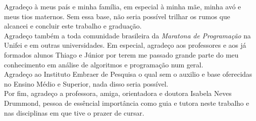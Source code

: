 \begin{agradecimentos}
Agradeço à meus país e minha família, em especial à minha mãe, minha avó e meus tios maternos. Sem essa base, não seria possível trilhar os rumos que alcancei e concluir este trabalho e graduação. \\

Agradeço também a toda comunidade brasileira da \textit{Maratona de Programação} na Unifei e em outras universidades. Em especial, agradeço aos professores e aos já formados alunos Thiago e Júnior por terem me passado grande parte do meu conhecimento em análise de algoritmos e programação num geral. \\

Agradeço ao Instituto Embraer de Pesquisa o qual sem o auxilio e base oferecidas no Ensino Médio e Superior, nada disso seria possível. \\

Por fim, agradeço a professora, amiga, orientadora e doutora Isabela Neves Drummond, pessoa de essêncial importância como guia e tutora neste trabalho e nas disciplinas em que tive o prazer de cursar. \\


\end{agradecimentos}
\newpage